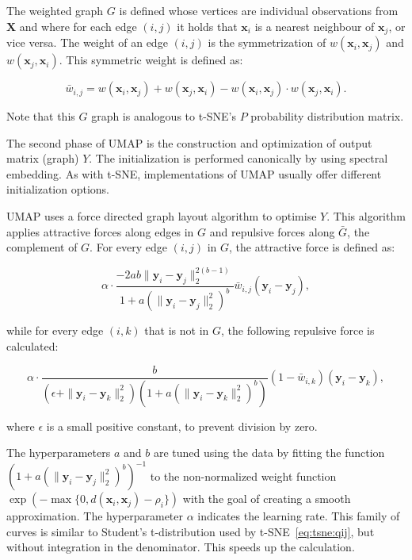 The weighted graph $G$ is defined whose vertices are individual observations from $\mathbf{X}$ and where for each edge $(i, j)$ it holds that $\mathbf{x}_i$ is a nearest neighbour of $\mathbf{x}_j$, or vice versa. The weight of an edge $(i, j)$ is the symmetrization of $w(\mathbf{x}_i, \mathbf{x}_j)$ and $w(\mathbf{x}_j, \mathbf{x}_i)$. This symmetric weight is defined as:

\begin{equation}
	\bar{w}_{i,j} = w(\mathbf{x}_i,\mathbf{x}_j)+w(\mathbf{x}_j,\mathbf{x}_i)-w(\mathbf{x}_i,\mathbf{x}_j)\cdot w(\mathbf{x}_j,\mathbf{x}_i).
\end{equation}

Note that this $G$ graph is analogous to t-SNE's $P$ probability distribution matrix.

The second phase of UMAP is the construction and optimization of output matrix (graph) $Y$. The initialization is performed canonically by using spectral embedding. As with t-SNE, implementations of UMAP usually offer different initialization options.

UMAP uses a force directed graph layout algorithm to optimise $Y$. This algorithm applies attractive forces along edges in $G$ and repulsive forces along $\bar{G}$, the complement of $G$. For every edge $(i, j)$ in $G$, the attractive force is defined as:

\begin{equation}
	\alpha\cdot
	\frac{-2ab\|\mathbf{y}_i-\mathbf{y}_j\|_2^{2(b-1)}}{1+a\left(\|\mathbf{y}_i-\mathbf{y}_j\|_2^{2}\right)^b}
	\bar{w}_{i,j}(\mathbf{y}_i-\mathbf{y}_j),
\end{equation}

while for every edge $(i, k)$  that is not in $G$, the following repulsive force is calculated:

\begin{equation}
	\alpha\cdot
	\frac{b}{\left(\epsilon+\|\mathbf{y}_i-\mathbf{y}_k\|_2^2\right)\left(1+a\left(\|\mathbf{y}_i-\mathbf{y}_k\|_2^{2}\right)^b\right)}
	\left(1- \bar{w}_{i,k}\right)(\mathbf{y}_i-\mathbf{y}_k),
\end{equation}

where $\epsilon$ is a small positive constant, to prevent division by zero.

The hyperparameters $a$ and $b$ are tuned using the data by fitting the function $\left(1+a\left(\|\mathbf{y}_i-\mathbf{y}_j\|_2^{2}\right)^b\right)^{-1}$ to the non-normalized weight function $\exp\left({-\max\{0,d(\mathbf{x}_i, \mathbf{x}_j)-\rho_i\}}\right)$ with the goal of creating a smooth approximation. The hyperparameter $\alpha$ indicates the learning rate. This family of curves is similar to Student's t-distribution used by t-SNE~\eqref{eq:tsne:qij}, but without integration in the denominator. This speeds up the calculation.


